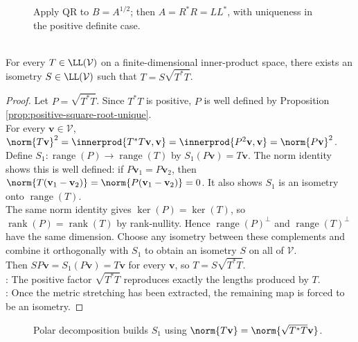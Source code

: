 \begin{figure}[H]
  \centering
  
  \caption{Apply QR to $B=A^{1/2}$; then $A=R^*R=LL^*$, with uniqueness in the positive definite case.}
  \label{fig:cholesky-from-qr}
\end{figure}

\begin{theorem} \label{thm:polar-decomposition} \\
For every $T\in\LL(\mathcal{V})$ on a finite-dimensional inner-product space, there exists an isometry $S\in\LL(\mathcal{V})$ such that $T=S\sqrt{T^*T}$.
\begin{proof}
Let $P=\sqrt{T^*T}$. Since $T^*T$ is positive, $P$ is well defined by Proposition \ref{prop:positive-square-root-unique}.\\
For every $\mathbf{v}\in\mathcal{V}$, $\norm{T\mathbf{v}}^2 =\innerprod{T^*T\mathbf{v},\mathbf{v}} =\innerprod{P^2\mathbf{v},\mathbf{v}} =\norm{P\mathbf{v}}^2$.\\
Define $S_1:\operatorname{range}(P)\to\operatorname{range}(T)$ by $S_1(P\mathbf{v})=T\mathbf{v}$. The norm identity shows this is well defined: if $P\mathbf{v}_1=P\mathbf{v}_2$, then $\norm{T(\mathbf{v}_1-\mathbf{v}_2)}=\norm{P(\mathbf{v}_1-\mathbf{v}_2)}=0$. It also shows $S_1$ is an isometry onto $\operatorname{range}(T)$.\\
The same norm identity gives $\ker(P)=\ker(T)$, so $\operatorname{rank}(P)=\operatorname{rank}(T)$ by rank-nullity. Hence $\operatorname{range}(P)^{\perp}$ and $\operatorname{range}(T)^{\perp}$ have the same dimension. Choose any isometry between these complements and combine it orthogonally with $S_1$ to obtain an isometry $S$ on all of $\mathcal{V}$.\\
Then $SP\mathbf{v}=S_1(P\mathbf{v})=T\mathbf{v}$ for every $\mathbf{v}$, so $T=S\sqrt{T^*T}$.\\
: The positive factor $\sqrt{T^*T}$ reproduces exactly the lengths produced by $T$.\\
: Once the metric stretching has been extracted, the remaining map is forced to be an isometry.
\end{proof}
\end{theorem}

\begin{figure}[H]
  \centering
  
  \caption{Polar decomposition builds $S_1$ using $\norm{T\mathbf{v}}=\norm{\sqrt{T^*T}\mathbf{v}}$.}
  \label{fig:polar-decomposition-operator}
\end{figure}


